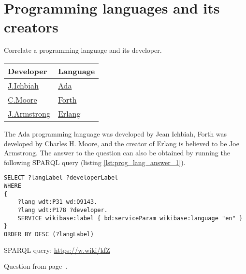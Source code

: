 \section{Programming languages and its creators}
\begin{exercise}
    \label{answer:prog_lang_1}
Correlate a programming language and its developer.
	\begin{tabular}{ll}
		Developer & Language\\
		\hline
		\href{https://en.wikipedia.org/wiki/Jean_Ichbiah}{J.Ichbiah} & \href{https://www.wikidata.org/wiki/Q154755}{Ada}\\
		\href{https://en.wikipedia.org/wiki/Charles_H._Moore}{C.Moore} & \href{https://www.wikidata.org/wiki/Q275472}{Forth}\\
		\href{https://en.wikipedia.org/wiki/Joe_Armstrong_(programmer)}{J.Armstrong} & \href{https://www.wikidata.org/wiki/Q334879}{Erlang}\\
	\end{tabular}
\end{exercise}
    The Ada programming language was developed by Jean Ichbiah, Forth was developed by Charles H. Moore, and the creator of Erlang is believed to be Joe Armstrong. The answer to the question can also be obtained by running the following SPARQL query (listing \ref{lst:prog_lang_answer_1}). 
	\begin{lstlisting}[language=SPARQL, caption={{Programming languages developers}\protect\footnotemark}, label=lst:prog_lang_answer_1]
SELECT ?langLabel ?developerLabel
WHERE
{
	?lang wdt:P31 wd:Q9143.
	?lang wdt:P178 ?developer.
	SERVICE wikibase:label { bd:serviceParam wikibase:language "en" }
}
ORDER BY DESC (?langLabel)
	\end{lstlisting}
SPARQL query: \href{https://w.wiki/kfZ}{https://w.wiki/kfZ}

Question from page~\pageref{question:prog_lang_1}.


